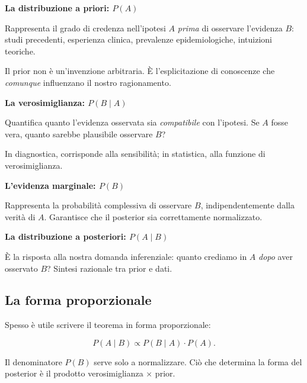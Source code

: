 \documentclass[
  italian,
  letterpaper,
  a4paper,
  11pt,
  open=any]{scrbook}
\theoremstyle{plain}
\theoremstyle{definition}
\theoremstyle{definition}
\theoremstyle{remark}
\begin{document}
\begin{tcolorbox}[enhanced jigsaw, arc=.35mm, bottomrule=.15mm, bottomtitle=1mm, breakable, colback=white, colbacktitle=quarto-callout-important-color!10!white, colframe=quarto-callout-important-color-frame, coltitle=black, left=2mm, leftrule=.75mm, opacityback=0, opacitybacktitle=0.6, rightrule=.15mm, title=\textcolor{quarto-callout-important-color}{\faExclamation}\hspace{0.5em}{I quattro attori del teorema di Bayes}, titlerule=0mm, toprule=.15mm, toptitle=1mm]

\textbf{La distribuzione a priori: \(P(A)\)}

Rappresenta il grado di credenza nell'ipotesi \(A\) \emph{prima} di
osservare l'evidenza \(B\): studi precedenti, esperienza clinica,
prevalenze epidemiologiche, intuizioni teoriche.

Il prior non è un'invenzione arbitraria. È l'esplicitazione di
conoscenze che \emph{comunque} influenzano il nostro ragionamento.

\textbf{La verosimiglianza: \(P(B \mid A)\)}

Quantifica quanto l'evidenza osservata sia \emph{compatibile} con
l'ipotesi. Se \(A\) fosse vera, quanto sarebbe plausibile osservare
\(B\)?

In diagnostica, corrisponde alla sensibilità; in statistica, alla
funzione di verosimiglianza.

\textbf{L'evidenza marginale: \(P(B)\)}

Rappresenta la probabilità complessiva di osservare \(B\),
indipendentemente dalla verità di \(A\). Garantisce che il posterior sia
correttamente normalizzato.

\textbf{La distribuzione a posteriori: \(P(A \mid B)\)}

È la risposta alla nostra domanda inferenziale: quanto crediamo in \(A\)
\emph{dopo} aver osservato \(B\)? Sintesi razionale tra prior e dati.

\end{tcolorbox}

\subsection{La forma proporzionale}\label{la-forma-proporzionale}

Spesso è utile scrivere il teorema in forma proporzionale:

\[
P(A \mid B) \propto P(B \mid A) \cdot P(A).
\]

Il denominatore \(P(B)\) serve solo a normalizzare. Ciò che determina la
forma del posterior è il prodotto verosimiglianza × prior.
\end{document}

